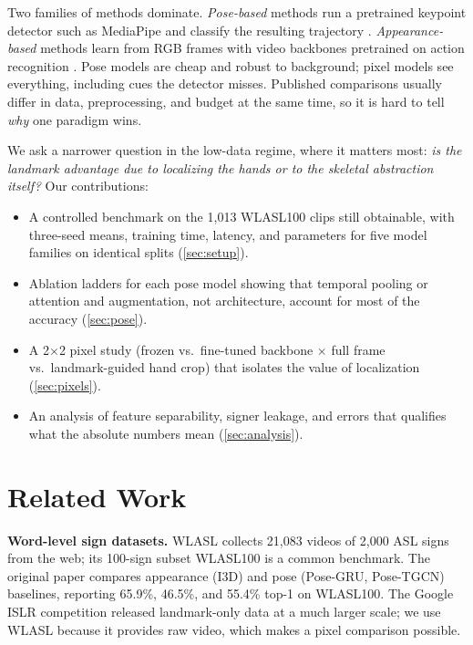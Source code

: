 \documentclass{article}
\begin{document}
Two families of methods dominate. \emph{Pose-based} methods run a pretrained keypoint detector such as
MediaPipe \citep{lugaresi2019mediapipe} and classify the resulting trajectory
\citep{li2020wlasl,bohacek2022spoter,selvaraj2022openhands}. \emph{Appearance-based} methods learn from
RGB frames with video backbones pretrained on action recognition \citep{carreira2017quo,tran2018closer}.
Pose models are cheap and robust to background; pixel models see everything, including cues the detector
misses. Published comparisons usually differ in data, preprocessing, and budget at the same time, so it
is hard to tell \emph{why} one paradigm wins.

We ask a narrower question in the low-data regime, where it matters most: \emph{is the landmark
advantage due to localizing the hands or to the skeletal abstraction itself?} Our contributions:
\begin{itemize}
\item A controlled benchmark on the 1{,}013 WLASL100 clips still obtainable, with three-seed means,
      training time, latency, and parameters for five model families on identical splits (\cref{sec:setup}).
\item Ablation ladders for each pose model showing that temporal pooling or attention and augmentation,
      not architecture, account for most of the accuracy (\cref{sec:pose}).
\item A 2$\times$2 pixel study (frozen vs.\ fine-tuned backbone $\times$ full frame vs.\ landmark-guided hand
      crop) that isolates the value of localization (\cref{sec:pixels}).
\item An analysis of feature separability, signer leakage, and errors that qualifies what the
      absolute numbers mean (\cref{sec:analysis}).
\end{itemize}

\section{Related Work}
\textbf{Word-level sign datasets.} WLASL \citep{li2020wlasl} collects 21{,}083 videos of 2{,}000 ASL
signs from the web; its 100-sign subset WLASL100 is a common benchmark. The original paper compares
appearance (I3D) and pose (Pose-GRU, Pose-TGCN) baselines, reporting 65.9\%, 46.5\%, and 55.4\% top-1 on
WLASL100. The Google ISLR competition \citep{kaggle2023islr} released landmark-only data at a much larger
scale; we use WLASL because it provides raw video, which makes a pixel comparison possible.
\end{document}
